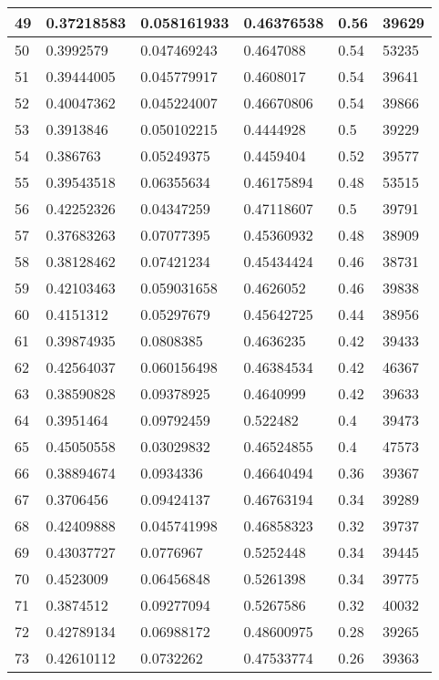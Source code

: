 \begin{longtable}{|l|l|l|l|l|l|}
49 & 0.37218583 & 0.058161933 & 0.46376538 & 0.56 & 39629 \\ \hline 
50 & 0.3992579 & 0.047469243 & 0.4647088 & 0.54 & 53235 \\ \hline 
51 & 0.39444005 & 0.045779917 & 0.4608017 & 0.54 & 39641 \\ \hline 
52 & 0.40047362 & 0.045224007 & 0.46670806 & 0.54 & 39866 \\ \hline 
53 & 0.3913846 & 0.050102215 & 0.4444928 & 0.5 & 39229 \\ \hline 
54 & 0.386763 & 0.05249375 & 0.4459404 & 0.52 & 39577 \\ \hline 
55 & 0.39543518 & 0.06355634 & 0.46175894 & 0.48 & 53515 \\ \hline 
56 & 0.42252326 & 0.04347259 & 0.47118607 & 0.5 & 39791 \\ \hline 
57 & 0.37683263 & 0.07077395 & 0.45360932 & 0.48 & 38909 \\ \hline 
58 & 0.38128462 & 0.07421234 & 0.45434424 & 0.46 & 38731 \\ \hline 
59 & 0.42103463 & 0.059031658 & 0.4626052 & 0.46 & 39838 \\ \hline 
60 & 0.4151312 & 0.05297679 & 0.45642725 & 0.44 & 38956 \\ \hline 
61 & 0.39874935 & 0.0808385 & 0.4636235 & 0.42 & 39433 \\ \hline 
62 & 0.42564037 & 0.060156498 & 0.46384534 & 0.42 & 46367 \\ \hline 
63 & 0.38590828 & 0.09378925 & 0.4640999 & 0.42 & 39633 \\ \hline 
64 & 0.3951464 & 0.09792459 & 0.522482 & 0.4 & 39473 \\ \hline 
65 & 0.45050558 & 0.03029832 & 0.46524855 & 0.4 & 47573 \\ \hline 
66 & 0.38894674 & 0.0934336 & 0.46640494 & 0.36 & 39367 \\ \hline 
67 & 0.3706456 & 0.09424137 & 0.46763194 & 0.34 & 39289 \\ \hline 
68 & 0.42409888 & 0.045741998 & 0.46858323 & 0.32 & 39737 \\ \hline 
69 & 0.43037727 & 0.0776967 & 0.5252448 & 0.34 & 39445 \\ \hline 
70 & 0.4523009 & 0.06456848 & 0.5261398 & 0.34 & 39775 \\ \hline 
71 & 0.3874512 & 0.09277094 & 0.5267586 & 0.32 & 40032 \\ \hline 
72 & 0.42789134 & 0.06988172 & 0.48600975 & 0.28 & 39265 \\ \hline 
73 & 0.42610112 & 0.0732262 & 0.47533774 & 0.26 & 39363 \\ \hline 

\end{longtable}
